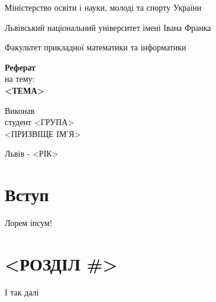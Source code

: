 \documentclass[12pt,a4paper]{article}
\begin{document}

\setlength{\parindent}{1.5cm}
\fontsize{14pt}{6mm}\selectfont

\begin{center}
  Міністерство освіти і науки, молоді та спорту України
  
  Львівський національний університет імені Івана Франка

  Факультет прикладної математики та інформатики
\end{center}


\vspace{6cm}

\begin{center}
  {\bfseries\Large Реферат}\\[0.5cm]
  на тему:\\[0.5cm]
  {\bfseries\Large <ТЕМА>}\\
\end{center}

\vspace{2cm}

\begin{flushleft}
  Виконав\\
  студент <ГРУПА>\\
  <ПРИЗВІЩЕ ІМ'Я>
\end{flushleft}

\vspace{6cm}

\begin{center}
  Львів - <РІК> 
\end{center}

\clearpage

\fontsize{14pt}{6mm}\selectfont

\section{Вступ}

Лорем іпсум!

\clearpage

\section{<РОЗДІЛ \#>}

І так далі
\end{document}

